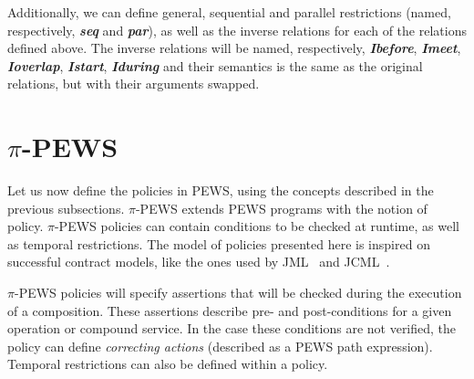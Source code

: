 \documentclass{sig-alternate}
\begin{document}
Additionally, we can define general, sequential and parallel restrictions (named, respectively, \textbf{\textit{seq}} and \textbf{\textit{par}}), as well as the inverse relations for each of the relations defined above. 
The inverse relations will be named, respectively, \textbf{\textit{Ibefore}}, \textbf{\textit{Imeet}}, \textbf{\textit{Ioverlap}}, \textbf{\textit{Istart}}, \textbf{\textit{Iduring}} and their semantics is the same as the original relations, but with their arguments swapped.

\section{$\pi$-PEWS} 
\label{section:pewsgrammar}

Let us now define the policies in PEWS, using the concepts described in the previous subsections.
$\pi$-PEWS extends PEWS programs with the notion of policy.
$\pi$-PEWS policies can contain conditions to be checked at runtime, as well as temporal restrictions.
The model of policies presented here is inspired on successful contract models,
like the ones used by JML~\cite{burdy:05} and JCML~\cite{jcml09,daCosta2010}.

$\pi$-PEWS policies will specify assertions that will be checked during the
execution of a composition. These assertions describe pre- and post-conditions for a given operation or compound service.
In the case these conditions are not verified, the policy can define
\textit{correcting actions} (described as a PEWS path expression). Temporal
restrictions can also be defined within a policy.
 
\end{document}
